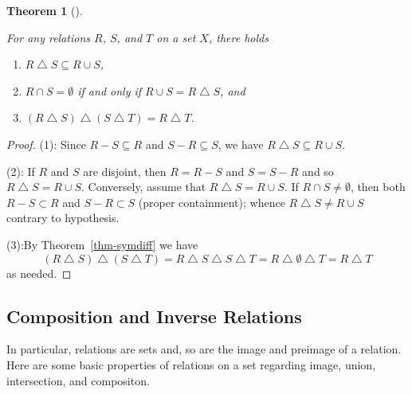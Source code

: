 \documentclass[
  letterpaper,
  10pt,
  reqno,
  twopage,
  openany]{book}
\providecommand{\tightlist}{%
  \setlength{\itemsep}{0pt}\setlength{\parskip}{0pt}}\usepackage{longtable,booktabs,array}
\theoremstyle{plain}
\theoremstyle{definition}
\theoremstyle{definition}
\theoremstyle{definition}
\theoremstyle{plain}
\theoremstyle{plain}
\newtheorem{theorem}{Theorem}[chapter]
\theoremstyle{remark}
\begin{document}
\leavevmode{}%
\begin{theorem}[]\label{thm-symdifftwo}

For any relations \(R\), \(S\), and \(T\) on a set \(X\), there holds

\begin{enumerate}
\def\labelenumi{\arabic{enumi}.}
\tightlist
\item
  \(R\bigtriangleup S\subseteq R\cup S\),
\item
  \(R\cap S=\emptyset\) if and only if \(R\cup S=R\bigtriangleup S\),
  and
\item
  \((R\bigtriangleup S)\bigtriangleup (S\bigtriangleup T)=R\bigtriangleup T\).
\end{enumerate}

\end{theorem}

\begin{proof}

(1): Since \(R-S\subseteq R\) and \(S-R\subseteq S\), we have
\(R\bigtriangleup S \subseteq R\cup S\).

(2): If \(R\) and \(S\) are disjoint, then \(R=R-S\) and \(S=S-R\) and
so \(R\bigtriangleup S = R\cup S\). Conversely, assume that
\(R\bigtriangleup S = R\cup S\). If \({R\cap S\neq \emptyset}\), then
both \({R-S\subset R}\) and \({S-R\subset S}\) (proper containment);
whence \(R\bigtriangleup S \neq R\cup S\) contrary to hypothesis.

(3):By Theorem~\ref{thm-symdiff} we have \begin{equation}
{(R\bigtriangleup S)\bigtriangleup (S\bigtriangleup T)} = {R\bigtriangleup S\bigtriangleup S\bigtriangleup T}
= {R\bigtriangleup \emptyset \bigtriangleup T} = {R \bigtriangleup T}
\end{equation} as needed.

\end{proof}

\hypertarget{composition-and-inverse-relations}{%
\subsection{Composition and Inverse
Relations}\label{composition-and-inverse-relations}}

In particular, relations are sets and, so are the image and preimage of
a relation. Here are some basic properties of relations on a set
regarding image, union, intersection, and compositon.
\end{document}
